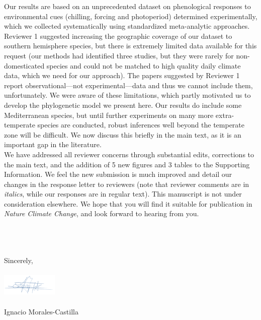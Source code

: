 \documentclass[11pt,a4paper]{letter}
\begin{document}
\begin{letter}{}
Our results are based on an unprecedented dataset on phenological responses to environmental cues (chilling, forcing and photoperiod) determined experimentally, which we collected systematically using standardized meta-analytic approaches. Reviewer 1 suggested increasing the geographic coverage of our dataset to southern hemisphere species, but there is extremely limited data available for this request (our methods had identified three studies, but they were rarely for non-domesticated species and could not be matched to high quality daily climate data, which we need for our approach). The papers suggested by Reviewer 1 report observational---not experimental---data and thus we cannot include them, unfortunately. We were aware of these limitations, which partly motivated us to develop the phylogenetic model we present here. Our results do include some Mediterranean species, but until further experiments on many more extra-temperate species are conducted, robust inferences well beyond the temperate zone will be difficult. We now discuss this briefly in the main text, as it is an important gap in the literature. %
\vspace{1.5ex}\\
We have addressed all reviewer concerns through substantial edits, corrections to the main text, and the addition of 5 new figures and 3 tables to the Supporting Information. We feel the new submission is much improved and detail our changes in the response letter to reviewers (note that reviewer comments are in \emph{italics}, while our responses are in regular text).  This manuscript is not under consideration elsewhere.  We hope that you will find it suitable for publication in \emph{Nature Climate Change}, and look forward to hearing from you.


\vspace{0.25ex}\\
\vspace{1.5ex}\\


\vspace{1.5ex}\\
\noindent Sincerely,\\
\vspace{1.5ex}\\
 \includegraphics[width=0.2\textwidth]{Signature_IMC.png} \\
 \vspace{1.5ex}\\
\noindent Ignacio Morales-Castilla


\end{letter}
\end{document}

